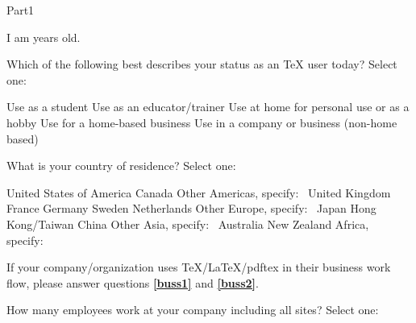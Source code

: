 \documentclass{article}
\begin{document}
\begin{exam}{Part1}
\begin{problem}
I am \fillin{.75in}{\empty} years old.
\end{problem}

\begin{problem}
Which of the following best describes your status as
an \TeX{} user today? Select one:

\begin{answers}{1}
    \bChoices
         Use as a student\eAns
         Use as an educator/trainer\eAns
         Use at home for personal use or as a hobby\eAns
         Use for a home-based business\eAns
         Use in a company or business (non-home based)\eAns
    \eChoices
\end{answers}
\end{problem}

\begin{problem}
What is your country of residence? Select one:

\setlength\columnseprule{0pt}

\begin{multicols}{2}
\begin{answers}{1}
    \bChoices
         United States of America\eAns
         Canada\eAns
         Other Americas, \mbox{specify: \fillin{1.24in}{\empty}}\eAns
         United Kingdom\eAns
         France\eAns
         Germany\eAns
         Sweden\eAns
         Netherlands\eAns
         Other Europe, \mbox{specify: \fillin{1.25in}{\empty}}\eAns
         Japan\eAns
         Hong Kong/Taiwan\eAns
         China\eAns
         Other Asia, \mbox{specify: \fillin{1.25in}{\empty}}\eAns
         Australia\eAns
         New Zealand\eAns
         Africa, \mbox{specify: \fillin{1.25in}{\empty}}\eAns
    \eChoices
\end{answers}
\end{multicols}
\end{problem}

\def\myDing{}

\begin{eqComments}[]%
\myDing If your company/organization uses \TeX/\LaTeX/\textsf{pdftex} in their business work flow,
please answer questions \textbf{\textcolor{blue}{\ref*{buss1}}} and \textbf{\textcolor{blue}{\ref*{buss2}}}.
\end{eqComments}

\begin{problem}\label{buss1}
How many employees work at your company including all
sites? Select one:


\end{problem}
\end{exam}
\end{document}

